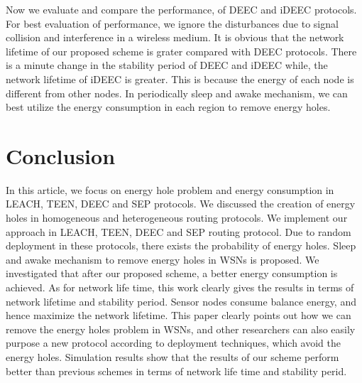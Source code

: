 \documentclass{article}
\begin{document}
Now we evaluate and compare the performance, of DEEC and iDEEC protocols. For best evaluation of performance, we ignore the disturbances due to signal collision and interference in a wireless medium. It is obvious that the network lifetime of our proposed scheme is grater compared with DEEC protocols. There is a minute change in the stability period of DEEC and iDEEC while, the network lifetime of iDEEC is greater. This is because the energy of each node is different from other nodes. In periodically sleep and awake mechanism, we can best utilize the energy consumption in each region to remove energy holes.
\section{Conclusion}
\label{sec:majhead}
In this article, we focus on energy hole problem and energy consumption in LEACH, TEEN, DEEC and SEP protocols. We discussed the creation of energy holes in homogeneous and heterogeneous routing protocols. We implement our approach in LEACH, TEEN, DEEC and SEP routing protocol. Due to random deployment in these protocols, there exists the probability of energy holes. Sleep and awake mechanism to remove energy holes in WSNs is proposed. We investigated that after our proposed scheme, a better energy consumption is achieved. As for network life time, this work clearly gives the results in terms of network lifetime and stability period. Sensor nodes consume balance energy, and hence maximize the network lifetime. This paper clearly points out how we can remove the energy holes problem in WSNs, and other researchers can also easily purpose a new protocol according to deployment techniques, which avoid the energy holes. Simulation results show that the results of our scheme perform better than previous schemes in terms of network life time and stability perid.
\end{document}
